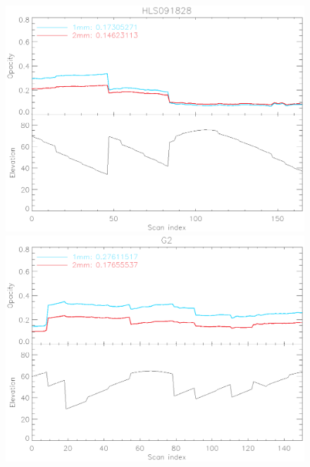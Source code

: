 \begin{figure}
\begin{center}
\includegraphics[clip, angle=0, scale =0.4]{Figures/hls_opacity_and_elev.eps}
\includegraphics[clip, angle=0, scale =0.4]{Figures/g2_opacity_and_elev.eps}
\caption[NEFD deep integration]{}
\label{fig:time_comparison}
\end{center}
\end{figure}

